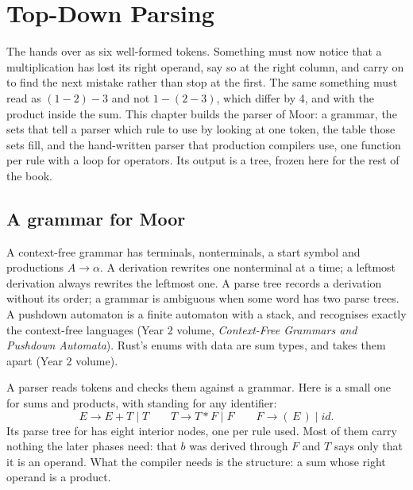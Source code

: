 \chapter{Top-Down Parsing}\label{ch:b3:top-down-parsing}

The  hands over  as six well-formed tokens. Something must now notice that a multiplication has lost its right operand, say so at the right column, and carry on to find the next mistake rather than stop at the first. The same something must read  as $(1 - 2) - 3$ and not $1 - (2 - 3)$, which differ by 4, and  with the product inside the sum. This chapter builds the parser of Moor: a grammar, the sets that tell a parser which rule to use by looking at one token, the table those sets fill, and the hand-written parser that production compilers use, one function per rule with a loop for operators. Its output is a tree, frozen here for the rest of the book.

\section{A grammar for Moor}\label{sec:b3:top-down-parsing:grammar}

\begin{recall}
A context-free grammar has terminals, nonterminals, a start symbol and productions $A \to \alpha$. A derivation rewrites one nonterminal at a time; a leftmost derivation always rewrites the leftmost one. A parse tree records a derivation without its order; a grammar is ambiguous when some word has two parse trees. A pushdown automaton is a finite automaton with a stack, and recognises exactly the context-free languages (Year 2 volume, \emph{Context-Free Grammars and Pushdown Automata}). Rust's enums with data are sum types, and  takes them apart (Year 2 volume).
\end{recall}

A parser reads tokens and checks them against a grammar. Here is a small one for sums and products, with  standing for any identifier:
\[
E \to E + T \mid T \qquad T \to T * F \mid F \qquad F \to (\,E\,) \mid \mathit{id}.
\]
Its parse tree for  has eight interior nodes, one per rule used. Most of them carry nothing the later phases need: that $b$ was derived through $F$ and $T$ says only that it is an operand. What the compiler needs is the structure: a sum whose right operand is a product.

